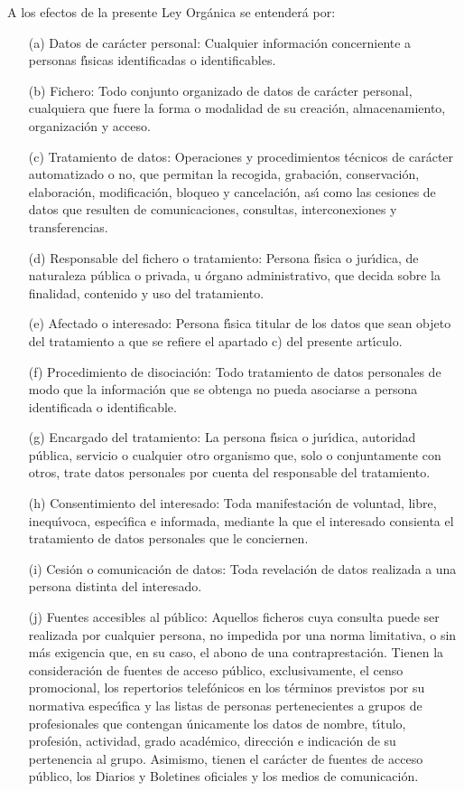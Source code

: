 A los efectos de la presente Ley Org\'anica se entender\'a por:
\begin{itemize}
\item [(a)] Datos de car\'acter personal: Cualquier informaci\'on concerniente 
a personas f\'{\i}sicas identificadas o identificables.
\item [(b)] Fichero: Todo conjunto organizado de datos de car\'acter personal,
cualquiera que fuere la forma o modalidad de su creaci\'on, almacenamiento,
organizaci\'on y acceso.
\item [(c)] Tratamiento de datos: Operaciones y procedimientos t\'ecnicos de 
car\'acter automatizado o no, que permitan la recogida, grabaci\'on, 
conservaci\'on, elaboraci\'on, modificaci\'on, bloqueo y cancelaci\'on, as\'{\i}
como las cesiones de datos que resulten de comunicaciones, consultas, 
interconexiones y transferencias.
\item [(d)] Responsable del fichero o tratamiento: Persona f\'{\i}sica o 
jur\'{\i}dica, de naturaleza p\'ublica o privada, u \'organo administrativo,
que decida sobre la finalidad, contenido y uso del tratamiento.
\item [(e)] Afectado o interesado: Persona f\'{\i}sica titular de los datos 
que sean objeto del tratamiento a que se refiere el apartado c) del presente 
art\'{\i}culo.
\item [(f)] Procedimiento de disociaci\'on: Todo tratamiento de datos 
personales de modo que la informaci\'on que se obtenga no pueda asociarse a 
persona identificada o identificable.
\item [(g)] Encargado del tratamiento: La persona f\'{\i}sica o jur\'{\i}dica,
autoridad p\'ublica, servicio o cualquier otro organismo que, solo o 
conjuntamente con otros, trate datos personales por cuenta del responsable del 
tratamiento.
\item [(h)] Consentimiento del interesado: Toda manifestaci\'on de voluntad, 
libre, inequ\'{\i}voca, espec\'{\i}fica e informada, mediante la que el 
interesado consienta el tratamiento de datos personales que le conciernen.
\item [(i)] Cesi\'on o comunicaci\'on de datos: Toda revelaci\'on de datos 
realizada a una persona distinta del interesado.
\item [(j)] Fuentes accesibles al p\'ublico: Aquellos ficheros cuya consulta 
puede ser realizada por cualquier persona, no impedida por una norma limitativa,
o sin m\'as exigencia que, en su caso, el abono de una contraprestaci\'on. 
Tienen la consideraci\'on de fuentes de acceso p\'ublico, exclusivamente, el 
censo promocional, los repertorios telef\'onicos en los t\'erminos previstos 
por su normativa espec\'{\i}fica y las listas de personas pertenecientes a 
grupos de profesionales que contengan \'unicamente los datos de nombre, 
t\'{\i}tulo, profesi\'on, actividad, grado acad\'emico, direcci\'on e 
indicaci\'on de su pertenencia al grupo. Asimismo, tienen el car\'acter de 
fuentes de acceso p\'ublico, los Diarios y Boletines oficiales y los medios de 
comunicaci\'on.
\end{itemize}
